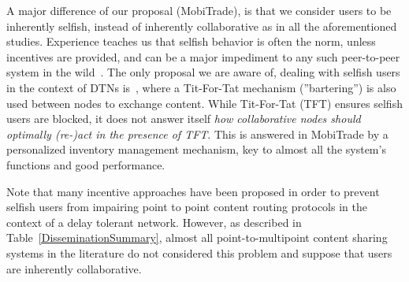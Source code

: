 A major difference of our proposal (MobiTrade), is that we consider users to be inherently selfish, instead of inherently collaborative as in all the aforementioned studies. Experience teaches us that selfish behavior is often the norm, unless incentives are provided, and can be a major impediment to any such peer-to-peer system in the wild~\cite{NashEquilibria}. The only proposal we are aware of, dealing with selfish users in the context of DTNs is~\cite{BarterDTN}, where a Tit-For-Tat mechanism (''bartering'') is also used between nodes to exchange content. While Tit-For-Tat (TFT) ensures selfish users are blocked, it does not answer itself \emph{how collaborative nodes should optimally (re-)act in the presence of TFT}. This is answered in MobiTrade by a personalized inventory management mechanism, key to almost all the system's functions and good performance.

Note that many incentive approaches have been proposed in order to prevent selfish users from impairing point to point content routing protocols in the context of a delay tolerant network. However, as described in Table~\ref{DisseminationSummary}, almost all point-to-multipoint content sharing systems in the literature do not considered this problem and suppose that users are inherently collaborative.

